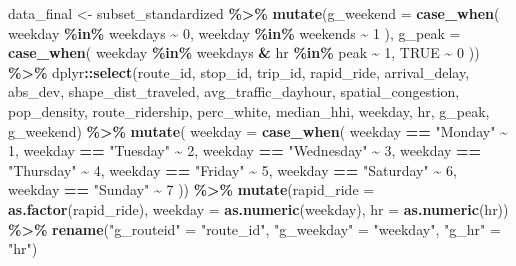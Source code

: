 \documentclass[
  12pt,
]{article}
\newenvironment{Shaded}{\begin{snugshade}}{\end{snugshade}}
\newcommand{\AttributeTok}[1]{\textcolor[rgb]{0.13,0.29,0.53}{#1}}
\newcommand{\ConstantTok}[1]{\textcolor[rgb]{0.56,0.35,0.01}{#1}}
\newcommand{\DecValTok}[1]{\textcolor[rgb]{0.00,0.00,0.81}{#1}}
\newcommand{\FunctionTok}[1]{\textcolor[rgb]{0.13,0.29,0.53}{\textbf{#1}}}
\newcommand{\NormalTok}[1]{#1}
\newcommand{\OtherTok}[1]{\textcolor[rgb]{0.56,0.35,0.01}{#1}}
\newcommand{\SpecialCharTok}[1]{\textcolor[rgb]{0.81,0.36,0.00}{\textbf{#1}}}
\newcommand{\StringTok}[1]{\textcolor[rgb]{0.31,0.60,0.02}{#1}}
\begin{document}
\begin{Shaded}
\begin{Highlighting}[]
\NormalTok{data\_final }\OtherTok{\textless{}{-}}\NormalTok{ subset\_standardized }\SpecialCharTok{\%\textgreater{}\%}
  \FunctionTok{mutate}\NormalTok{(}\AttributeTok{g\_weekend =} \FunctionTok{case\_when}\NormalTok{(}
\NormalTok{    weekday }\SpecialCharTok{\%in\%}\NormalTok{ weekdays }\SpecialCharTok{\textasciitilde{}} \DecValTok{0}\NormalTok{,}
\NormalTok{    weekday }\SpecialCharTok{\%in\%}\NormalTok{ weekends }\SpecialCharTok{\textasciitilde{}} \DecValTok{1}
\NormalTok{  ),}
  \AttributeTok{g\_peak =} \FunctionTok{case\_when}\NormalTok{(}
\NormalTok{    weekday }\SpecialCharTok{\%in\%}\NormalTok{ weekdays }\SpecialCharTok{\&}\NormalTok{ hr }\SpecialCharTok{\%in\%}\NormalTok{ peak }\SpecialCharTok{\textasciitilde{}} \DecValTok{1}\NormalTok{,}
    \ConstantTok{TRUE} \SpecialCharTok{\textasciitilde{}} \DecValTok{0}
\NormalTok{  )) }\SpecialCharTok{\%\textgreater{}\%}
\NormalTok{  dplyr}\SpecialCharTok{::}\FunctionTok{select}\NormalTok{(route\_id, }
\NormalTok{         stop\_id, }
\NormalTok{         trip\_id, }
\NormalTok{         rapid\_ride, }
\NormalTok{         arrival\_delay, }
\NormalTok{         abs\_dev,}
\NormalTok{         shape\_dist\_traveled, }
\NormalTok{         avg\_traffic\_dayhour, }
\NormalTok{         spatial\_congestion,}
\NormalTok{         pop\_density,}
\NormalTok{         route\_ridership,}
\NormalTok{         perc\_white,}
\NormalTok{         median\_hhi,}
\NormalTok{         weekday, }
\NormalTok{         hr,}
\NormalTok{         g\_peak,}
\NormalTok{         g\_weekend) }\SpecialCharTok{\%\textgreater{}\%}
  \FunctionTok{mutate}\NormalTok{(}
    \AttributeTok{weekday =} \FunctionTok{case\_when}\NormalTok{(}
\NormalTok{      weekday }\SpecialCharTok{==} \StringTok{"Monday"} \SpecialCharTok{\textasciitilde{}} \DecValTok{1}\NormalTok{,}
\NormalTok{      weekday }\SpecialCharTok{==} \StringTok{"Tuesday"} \SpecialCharTok{\textasciitilde{}} \DecValTok{2}\NormalTok{,}
\NormalTok{      weekday }\SpecialCharTok{==} \StringTok{"Wednesday"} \SpecialCharTok{\textasciitilde{}} \DecValTok{3}\NormalTok{,}
\NormalTok{      weekday }\SpecialCharTok{==} \StringTok{"Thursday"} \SpecialCharTok{\textasciitilde{}} \DecValTok{4}\NormalTok{,}
\NormalTok{      weekday }\SpecialCharTok{==} \StringTok{"Friday"} \SpecialCharTok{\textasciitilde{}} \DecValTok{5}\NormalTok{,}
\NormalTok{      weekday }\SpecialCharTok{==} \StringTok{"Saturday"} \SpecialCharTok{\textasciitilde{}} \DecValTok{6}\NormalTok{,}
\NormalTok{      weekday }\SpecialCharTok{==} \StringTok{"Sunday"} \SpecialCharTok{\textasciitilde{}} \DecValTok{7}
\NormalTok{    )) }\SpecialCharTok{\%\textgreater{}\%}
  \FunctionTok{mutate}\NormalTok{(}\AttributeTok{rapid\_ride =} \FunctionTok{as.factor}\NormalTok{(rapid\_ride),}
         \AttributeTok{weekday =} \FunctionTok{as.numeric}\NormalTok{(weekday),}
         \AttributeTok{hr =} \FunctionTok{as.numeric}\NormalTok{(hr)) }\SpecialCharTok{\%\textgreater{}\%}
  \FunctionTok{rename}\NormalTok{(}\StringTok{"g\_routeid"} \OtherTok{=} \StringTok{"route\_id"}\NormalTok{,}
         \StringTok{"g\_weekday"} \OtherTok{=} \StringTok{"weekday"}\NormalTok{,}
         \StringTok{"g\_hr"} \OtherTok{=} \StringTok{"hr"}\NormalTok{)}


\end{Highlighting}
\end{Shaded}
\end{document}
